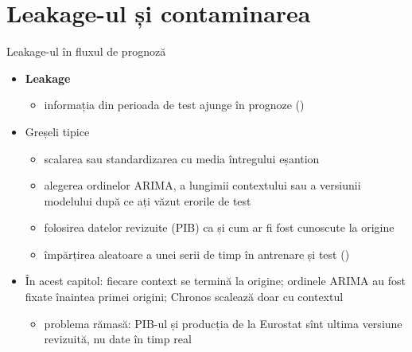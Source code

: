 \section{Leakage-ul și contaminarea}

\begin{frame}{Leakage-ul în fluxul de prognoză}
\itemsize{\footnotesize}
\begin{itemize}
    \item \textbf{Leakage}
    \begin{itemize}
        \item informația din perioada de test ajunge în prognoze ()
    \end{itemize}
    \item Greșeli tipice
    \begin{itemize}
        \item scalarea sau standardizarea cu media întregului eșantion
        \item alegerea ordinelor ARIMA, a lungimii contextului sau a versiunii modelului după ce ați văzut erorile de test
        \item folosirea datelor revizuite (PIB) ca și cum ar fi fost cunoscute la origine
        \item împărțirea aleatoare a unei serii de timp în antrenare și test ()
    \end{itemize}
    \item În acest capitol: fiecare context se termină la origine; ordinele ARIMA au fost fixate înaintea primei origini; Chronos scalează doar cu contextul
    \begin{itemize}
        \item problema rămasă: PIB-ul și producția de la Eurostat sînt ultima versiune revizuită, nu date în timp real
    \end{itemize}
\end{itemize}
\end{frame}

